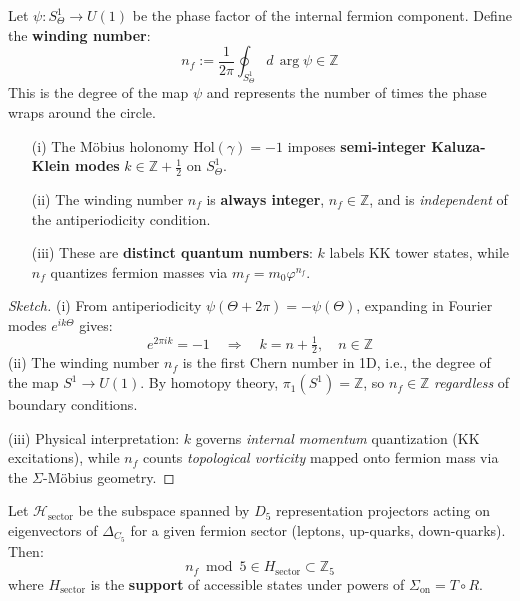 \documentclass[12pt]{article}
\begin{document}
\begin{definition}
Let $\psi: S^1_\Theta \to U(1)$ be the phase factor of the internal fermion component. Define the \textbf{winding number}:
\begin{equation}
n_f := \frac{1}{2\pi} \oint_{S^1_\Theta} d\,\arg\psi \in \mathbb{Z}
\end{equation}
This is the degree of the map $\psi$ and represents the number of times the phase wraps around the circle.
\end{definition}

\begin{proposition}
\label{prop:kn_separation}
\begin{enumerate}
\item[(i)] The M\"obius holonomy $\text{Hol}(\gamma) = -1$ imposes \textbf{semi-integer Kaluza-Klein modes} $k \in \mathbb{Z} + \tfrac{1}{2}$ on $S^1_\Theta$.
\item[(ii)] The winding number $n_f$ is \textbf{always integer}, $n_f \in \mathbb{Z}$, and is \emph{independent} of the antiperiodicity condition.
\item[(iii)] These are \textbf{distinct quantum numbers}: $k$ labels KK tower states, while $n_f$ quantizes fermion masses via $m_f = m_0 \varphi^{n_f}$.
\end{enumerate}
\end{proposition}

\begin{proof}[Sketch]
(i) From antiperiodicity $\psi(\Theta + 2\pi) = -\psi(\Theta)$, expanding in Fourier modes $e^{ik\Theta}$ gives:
\[
e^{2\pi i k} = -1 \quad \Rightarrow \quad k = n + \tfrac{1}{2}, \quad n \in \mathbb{Z}
\]
(ii) The winding number $n_f$ is the first Chern number in 1D, i.e., the degree of the map $S^1 \to U(1)$. By homotopy theory, $\pi_1(S^1) = \mathbb{Z}$, so $n_f \in \mathbb{Z}$ \emph{regardless} of boundary conditions.

(iii) Physical interpretation: $k$ governs \emph{internal momentum} quantization (KK excitations), while $n_f$ counts \emph{topological vorticity} mapped onto fermion mass via the $\Sigma$-M\"obius geometry.
\end{proof}

\begin{lemma}
\label{lem:dihedral_selection}
Let $\mathcal{H}_{\text{sector}}$ be the subspace spanned by $D_5$ representation projectors acting on eigenvectors of $\Delta_{C_5}$ for a given fermion sector (leptons, up-quarks, down-quarks). Then:
\begin{equation}
\boxed{n_f \bmod 5 \in H_{\text{sector}} \subset \mathbb{Z}_5}
\end{equation}
where $H_{\text{sector}}$ is the \textbf{support} of accessible states under powers of $\Sigma_{\text{on}} = T \circ R$.
\end{lemma}
\end{document}
